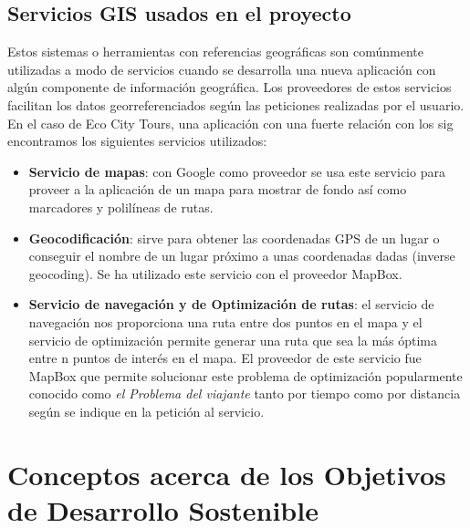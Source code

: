 	\subsection{Servicios GIS usados en el proyecto}
	Estos sistemas o herramientas con referencias geográficas son comúnmente utilizadas a modo de servicios cuando se desarrolla una nueva aplicación con algún componente de información geográfica. Los proveedores de estos servicios facilitan los datos  georreferenciados según las peticiones realizadas por el usuario. En el caso de Eco City Tours, una aplicación con una fuerte relación con los \acrshort{sig} encontramos los siguientes servicios utilizados:
	\begin{itemize}
		\item \textbf{Servicio de mapas}: con Google como proveedor se usa este servicio para proveer a la aplicación de un mapa para mostrar de fondo así como marcadores y polilíneas de rutas.
		
		\item \textbf{Geocodificación}: sirve para obtener las coordenadas GPS de un lugar o conseguir el nombre de un lugar próximo a unas coordenadas dadas (inverse geocoding). Se ha utilizado este servicio con el proveedor MapBox.
		
		\item \textbf{Servicio de navegación y de Optimización de rutas}: el servicio de navegación nos proporciona una ruta entre dos puntos en el mapa y el servicio de optimización permite generar una ruta que sea la más óptima entre n puntos de interés en el mapa. El proveedor de este servicio fue MapBox que permite solucionar este problema de optimización popularmente conocido como \textit{el Problema del viajante} tanto por tiempo como por distancia según se indique en la petición al servicio.
		
	\end{itemize}
	
\section{Conceptos acerca de los Objetivos de Desarrollo Sostenible}
